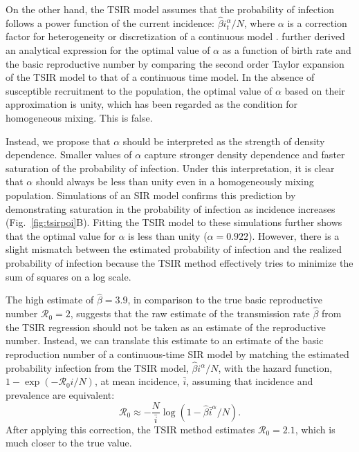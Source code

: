 \documentclass{article}
\newcommand{\fref}[1]{Fig.~\ref{fig:#1}}
\begin{document}
On the other hand, the TSIR model assumes that the probability of infection follows a power function of the current incidence: $\hat{\beta} i_t^\alpha/N$, where $\alpha$ is a correction factor for heterogeneity or discretization of a continuous model \citep{glass2003interpreting}.
\cite{glass2003interpreting} further derived an analytical expression for the optimal value of $\alpha$ as a function of birth rate and the basic reproductive number by comparing the second order Taylor expansion of the TSIR model to that of a continuous time model.
In the absence of susceptible recruitment to the population, the optimal value of $\alpha$ based on their approximation is unity, which has been regarded as the condition for homogeneous mixing.
This is false.

Instead, we propose that $\alpha$ should be interpreted as the strength of density dependence.
Smaller values of $\alpha$ capture stronger density dependence and faster saturation of the probability of infection.
Under this interpretation, it is clear that $\alpha$ should always be less than unity even in a homogeneously mixing population.
Simulations of an SIR model confirms this prediction by demonstrating saturation in the probability of infection as incidence increases (\fref{tsirpoi}B).
Fitting the TSIR model to these simulations further shows that the optimal value for $\alpha$ is less than unity ($\alpha = 0.922$).
However, there is a slight mismatch between the estimated probability of infection and the realized probability of infection because the TSIR method effectively tries to minimize the sum of squares on a log scale.

The high estimate of $\hat{\beta} = 3.9$, in comparison to the true basic reproductive number $\mathcal R_0 = 2$, suggests that the raw estimate of the transmission rate $\hat{\beta}$ from the TSIR regression should not be taken as an estimate of the reproductive number.
Instead, we can translate this estimate to an estimate of the basic reproduction number of a continuous-time SIR model by matching the estimated probability infection from the TSIR model, $\hat{\beta} i^\alpha/N$, with the hazard function, $1 - \exp(-\mathcal R_0 i/N)$, at mean incidence, $\bar{i}$, assuming that incidence and prevalence are equivalent:
\begin{equation}
\mathcal R_0 \approx - \frac{N}{\bar{i}} \log \left(1 - \hat{\beta} \bar{i}^\alpha/N \right).
\end{equation}
After applying this correction, the TSIR method estimates $\mathcal R_0 = 2.1$, which is much closer to the true value.
\end{document}
